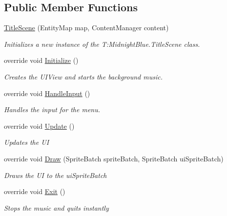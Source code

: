 \subsection*{Public Member Functions}
\begin{DoxyCompactItemize}
\item 
\hyperlink{class_midnight_blue_1_1_title_scene_a409eb89a58dbec10d5a0002ce78bc9a3}{Title\+Scene} (Entity\+Map map, Content\+Manager content)
\begin{DoxyCompactList}\small\item\em Initializes a new instance of the T\+:\+Midnight\+Blue.\+Title\+Scene class. \end{DoxyCompactList}\item 
override void \hyperlink{class_midnight_blue_1_1_title_scene_a793aa8253fba8d62a4ee19f042b22891}{Initialize} ()
\begin{DoxyCompactList}\small\item\em Creates the U\+I\+View and starts the background music. \end{DoxyCompactList}\item 
override void \hyperlink{class_midnight_blue_1_1_title_scene_a54dc02f150eb90dac2fcc6e37a077723}{Handle\+Input} ()
\begin{DoxyCompactList}\small\item\em Handles the input for the menu. \end{DoxyCompactList}\item 
override void \hyperlink{class_midnight_blue_1_1_title_scene_a4052b2a261434462cd0150e2f4da3c5b}{Update} ()
\begin{DoxyCompactList}\small\item\em Updates the UI \end{DoxyCompactList}\item 
override void \hyperlink{class_midnight_blue_1_1_title_scene_a03fa806a36226ec5fd0ce09870109c18}{Draw} (Sprite\+Batch sprite\+Batch, Sprite\+Batch ui\+Sprite\+Batch)
\begin{DoxyCompactList}\small\item\em Draws the UI to the ui\+Sprite\+Batch \end{DoxyCompactList}\item 
override void \hyperlink{class_midnight_blue_1_1_title_scene_aed29e37e9f849cc8f8443bae057a8eb8}{Exit} ()
\begin{DoxyCompactList}\small\item\em Stops the music and quits instantly \end{DoxyCompactList}\item 

\end{DoxyCompactItemize}
